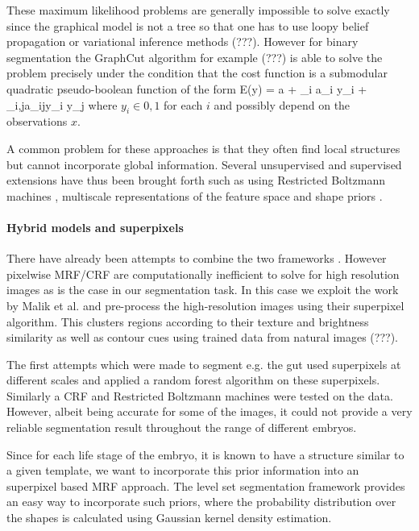 \documentclass{article} %
\begin{document}
These maximum likelihood problems are generally impossible to solve exactly since the graphical model is not a tree so that one has to use loopy belief propagation or variational inference methods (???). However for binary segmentation the GraphCut algorithm for example (???) is able to solve the problem precisely under the condition that the cost function is a submodular quadratic pseudo-boolean function of the form
\beqs
E(y) = a + \sum_i a_i y_i + \sum_{i,j}a_{ij}y_i y_j
\eeqs
where $y_i\in {0,1}$ for each $i$ and possibly depend on the observations $x$. 

A common problem for these approaches is that they often find local structures but cannot incorporate global information. Several unsupervised and supervised extensions have thus been brought forth such as using Restricted Boltzmann machines \cite{KaeSohn13_CRF}, multiscale representations of the feature space \cite{He04_MultiScale} and shape priors \cite{Lempitsky_BranchMin}.


\paragraph{Hybrid models and superpixels}
There have already been attempts to combine the two frameworks \cite{Huang04_MRFDM, Chen12_MIGraphCut, Uzunbas13_MultiOrgan, Schlesinger13}. 
However pixelwise MRF/CRF are computationally inefficient to solve for high resolution images as is the case in our segmentation task. In this case we exploit the work by Malik et al. \cite{Malik03_Superpixel} and pre-process the high-resolution images using their superpixel algorithm. This clusters regions according to their texture and brightness similarity as well as contour cues using trained data from natural images (???).

The first attempts which were made to segment e.g. the gut used superpixels at different scales and applied a random forest algorithm on these superpixels. Similarly a CRF and Restricted Boltzmann machines were tested on the data. However, albeit being accurate for some of the images, it could not provide a very reliable segmentation result throughout the range of different embryos. 

Since for each life stage of the embryo, it is known to have a structure similar to a given template, we want to incorporate this prior information into an superpixel based MRF approach.  
The level set segmentation framework provides an easy way to incorporate such priors, where the probability distribution over the shapes is calculated using Gaussian kernel density estimation.
\end{document}
